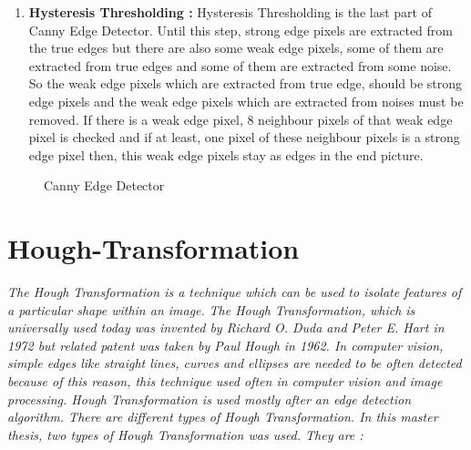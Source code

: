 \begin{enumerate}
\item \textbf{Hysteresis Thresholding : } Hysteresis Thresholding is the last part of Canny Edge Detector. Until this step, strong edge pixels are extracted from the true edges but there are also some weak edge pixels, some of them are extracted from true edges and some of them are extracted from some noise. So the weak edge pixels which are extracted from true edge, should be strong edge pixels and the weak edge pixels which are extracted from noises must be removed. If there is a weak edge pixel, 8 neighbour pixels of that weak edge pixel is checked and if at least, one pixel of these neighbour pixels is a strong edge pixel then, this weak edge pixels stay as edges in the end picture. 

\end{enumerate}


\begin{figure}[H]
  \centering
  \hfill
  \caption{Canny Edge Detector\cite{Canny_Edge_Detector}}
\end{figure} 





%
\section{Hough-Transformation}\label{sec:Hough-Transformation}
%
\emph{\color{red}The Hough Transformation is a technique which can be used to isolate features of a particular shape within an image.}\emph{\color{blue} The Hough Transformation, which is universally used today was invented by Richard O. Duda and Peter E. Hart in 1972 but related patent was taken by Paul Hough in 1962.\cite{Hough_Transformation} In computer vision, simple edges like straight lines, curves and ellipses are needed to be often detected because of this reason, this technique used often in computer vision and image processing. Hough Transformation is used mostly after an edge detection algorithm. There are different types of Hough Transformation. In this master thesis, two types of Hough Transformation was used. They are :}

